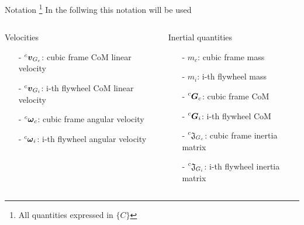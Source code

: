 \begin{frame}{Notation \footnote[frame]{All quantities expressed in $\{C\}$}}
  In the follwing this notation will be used
  \begin{columns}
    \begin{column}{0.5\textwidth}
      \begin{block}{Velocities}
        \begin{itemize}
        \item[-] $\prescript{c}{}{\vec{v}}_{G_{c}}$: cubic frame CoM linear velocity
        \item[-] $\prescript{c}{}{\vec{v}}_{G_{i}}$: i-th flywheel CoM linear velocity
        \item[-] $\prescript{c}{}{\vec{\omega}}_{c}$: cubic frame angular velocity
        \item[-] $\prescript{c}{}{\vec{\omega}}_{i}$: i-th flywheel angular velocity
        \end{itemize}
      \end{block}
    \end{column}
    \begin{column}{0.5\textwidth}
      \begin{block}{Inertial quantities}
        \begin{itemize}
        \item[-] $m_c$: cubic frame mass
        \item[-] $m_i$: i-th flywheel mass
        \item[-] $\prescript{c}{}{\vec{G}}_{c}$: cubic frame CoM
        \item[-] $\prescript{c}{}{\vec{G}}_{i}$: i-th flywheel CoM 
        \item[-] $\prescript{c}{}{\mathfrak{J}}_{G_{c}}$: cubic frame inertia matrix
        \item[-] $\prescript{c}{}{\mathfrak{J}}_{G_{i}}$: i-th flywheel inertia matrix
        \end{itemize}
      \end{block}
    \end{column}
  \end{columns}
\end{frame}


